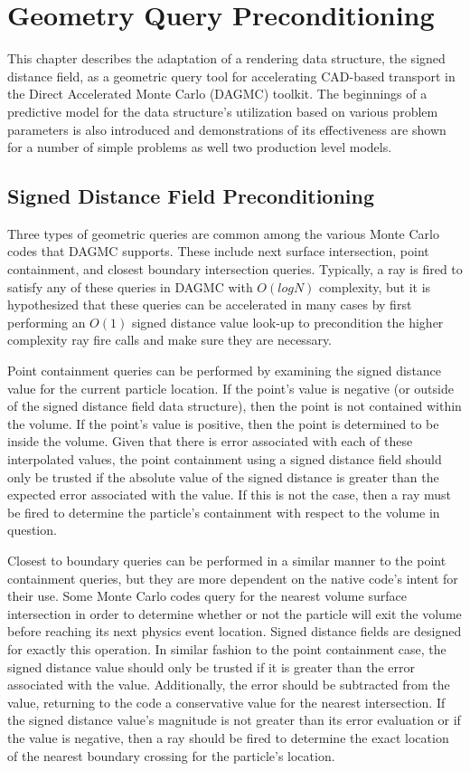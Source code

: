 
\chapter{Geometry Query Preconditioning}\label{ch:preconditioning}

This chapter describes the adaptation of a rendering data structure, the signed
distance field, as a geometric query tool for accelerating CAD-based transport
in the Direct Accelerated Monte Carlo (DAGMC) toolkit. The beginnings of a
predictive model for the data structure's utilization based on various problem
parameters is also introduced and demonstrations of its effectiveness are shown
for a number of simple problems as well two production level models.

\section{Signed Distance Field Preconditioning}\label{section:preconditioner_theory}

Three types of geometric queries are common among the various Monte Carlo codes
that DAGMC supports. These include next surface intersection, point containment,
and closest boundary intersection queries. Typically, a ray is fired to satisfy
any of these queries in DAGMC with $O(logN)$ complexity, but it is hypothesized
that these queries can be accelerated in many cases by first performing an
$O(1)$ signed distance value look-up to precondition the higher complexity ray
fire calls and make sure they are necessary.

Point containment queries can be performed by examining the signed distance
value for the current particle location. If the point's value is negative (or
outside of the signed distance field data structure), then the point is not
contained within the volume. If the point's value is positive, then the point is
determined to be inside the volume. Given that there is error associated with
each of these interpolated values, the point containment using a signed distance
field should only be trusted if the absolute value of the signed distance is
greater than the expected error associated with the value. If this is not the
case, then a ray must be fired to determine the particle's containment with
respect to the volume in question.

Closest to boundary queries can be performed in a similar manner to the point
containment queries, but they are more dependent on the native code's intent for
their use. Some Monte Carlo codes query for the nearest volume surface
intersection in order to determine whether or not the particle will exit the
volume before reaching its next physics event location. Signed distance fields are
designed for exactly this operation. In similar fashion to the point
containment case, the signed distance value should only be trusted if it is greater than the
error associated with the value. Additionally, the error should be subtracted
from the value, returning to the code a conservative value for the nearest
intersection. If the signed distance value's magnitude is not greater than its
error evaluation or if the value is negative, then a ray should be fired to
determine the exact location of the nearest boundary crossing for the particle's
location.

